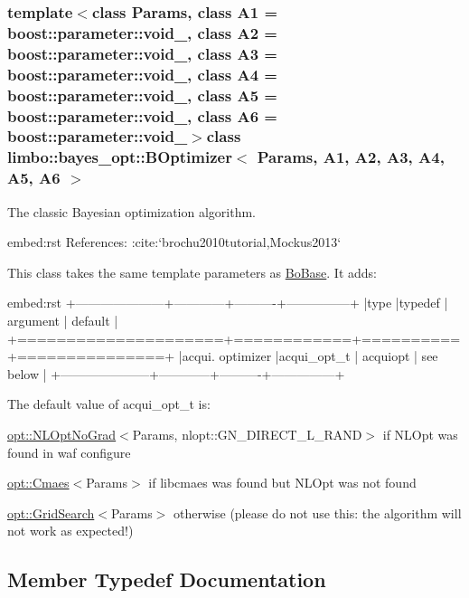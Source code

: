 \subsubsection*{template$<$class Params, class A1 = boost\+::parameter\+::void\+\_\+, class A2 = boost\+::parameter\+::void\+\_\+, class A3 = boost\+::parameter\+::void\+\_\+, class A4 = boost\+::parameter\+::void\+\_\+, class A5 = boost\+::parameter\+::void\+\_\+, class A6 = boost\+::parameter\+::void\+\_\+$>$class limbo\+::bayes\+\_\+opt\+::\+B\+Optimizer$<$ Params, A1, A2, A3, A4, A5, A6 $>$}

The classic Bayesian optimization algorithm.

\begin{DoxyVerb}embed:rst
References: :cite:`brochu2010tutorial,Mockus2013`
\end{DoxyVerb}


This class takes the same template parameters as \hyperlink{classlimbo_1_1bayes__opt_1_1_bo_base}{Bo\+Base}. It adds\+: \begin{DoxyVerb}embed:rst
+---------------------+------------+----------+---------------+
|type                 |typedef     | argument | default       |
+=====================+============+==========+===============+
|acqui. optimizer     |acqui_opt_t | acquiopt | see below     |
+---------------------+------------+----------+---------------+
\end{DoxyVerb}


The default value of acqui\+\_\+opt\+\_\+t is\+:
\begin{DoxyItemize}
\item {\ttfamily \hyperlink{structlimbo_1_1opt_1_1_n_l_opt_no_grad}{opt\+::\+N\+L\+Opt\+No\+Grad}$<$Params, nlopt\+::\+G\+N\+\_\+\+D\+I\+R\+E\+C\+T\+\_\+\+L\+\_\+\+R\+A\+N\+D$>$} if N\+L\+Opt was found in {\ttfamily waf configure}
\item {\ttfamily \hyperlink{structlimbo_1_1opt_1_1_cmaes}{opt\+::\+Cmaes}$<$Params$>$} if libcmaes was found but N\+L\+Opt was not found
\item {\ttfamily \hyperlink{structlimbo_1_1opt_1_1_grid_search}{opt\+::\+Grid\+Search}$<$Params$>$} otherwise (please do not use this\+: the algorithm will not work as expected!) 
\end{DoxyItemize}

\subsection{Member Typedef Documentation}
\hypertarget{classlimbo_1_1bayes__opt_1_1_b_optimizer_a5ade62cb11aeb891ed13059d6bed28d2}{}
